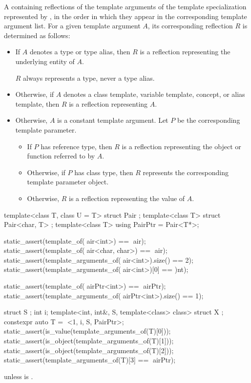 \begin{itemdescr}
\pnum
\returns
A  containing reflections
of the template arguments
of the template specialization represented by ,
in the order in which they appear in the corresponding template argument list.
For a given template argument $A$,
its corresponding reflection $R$ is determined as follows:
\begin{itemize}
\item
  If $A$ denotes a type or type alias,
  then $R$ is a reflection representing the underlying entity of $A$.
  \begin{note}
  $R$ always represents a type, never a type alias.
  \end{note}
\item
  Otherwise, if $A$ denotes a
  class template,
  variable template,
  concept, or
  alias template,
  then $R$ is a reflection representing $A$.
\item
  Otherwise, $A$ is a constant template argument.
  Let $P$ be the corresponding template parameter.
  \begin{itemize}
  \item
    If $P$ has reference type,
    then $R$ is a reflection
    representing the object or function referred to by $A$.
  \item
    Otherwise, if $P$ has class type,
    then $R$ represents the corresponding template parameter object.
  \item
    Otherwise, $R$ is a reflection representing the value of $A$.
  \end{itemize}
\end{itemize}
\begin{example}
\begin{codeblock}
template<class T, class U = T> struct Pair { };
template<class T> struct Pair<char, T> { };
template<class T> using PairPtr = Pair<T*>;

static_assert(template_of(^^Pair<int>) == ^^Pair);
static_assert(template_of(^^Pair<char, char>) == ^^Pair);
static_assert(template_arguments_of(^^Pair<int>).size() == 2);
static_assert(template_arguments_of(^^Pair<int>)[0] == ^^int);

static_assert(template_of(^^PairPtr<int>) == ^^PairPtr);
static_assert(template_arguments_of(^^PairPtr<int>).size() == 1);

struct S { };
int i;
template<int, int&, S, template<class> class>
  struct X { };
constexpr auto T = ^^X<1, i, S{}, PairPtr>;
static_assert(is_value(template_arguments_of(T)[0]));
static_assert(is_object(template_arguments_of(T)[1]));
static_assert(is_object(template_arguments_of(T)[2]));
static_assert(template_arguments_of(T)[3] == ^^PairPtr);
\end{codeblock}
\end{example}

\pnum
\throws
{} unless
 is .
\end{itemdescr}

